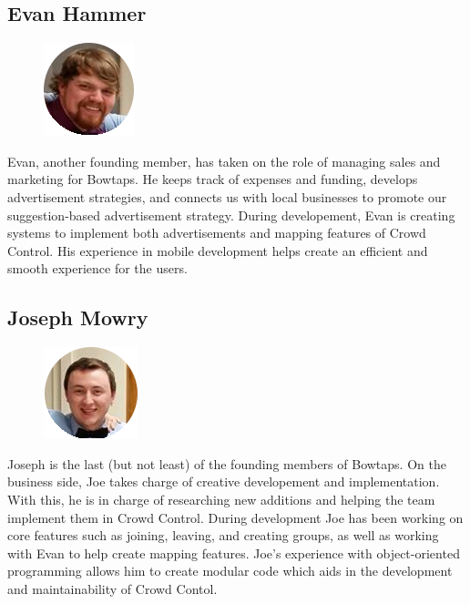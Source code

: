 \noindent
\subsection{Evan Hammer}
\begin{minipage}[t]{\linewidth}%
\begin{figure}
\includegraphics{evanhammer}
\end{figure}
Evan, another founding member, has taken on the role of managing sales and marketing for Bowtaps. He keeps track of expenses and funding, develops advertisement strategies, and connects us with local businesses to promote our suggestion-based advertisement strategy. During developement, Evan is creating systems to implement both advertisements and mapping features of Crowd Control. His experience in mobile development helps create an efficient and smooth experience for the users.
\newline
\newline
\newline
\end{minipage}
 
\noindent
\subsection{Joseph Mowry}
\begin{minipage}[t]{\linewidth}%
\begin{figure}
\includegraphics{joemowry}
\end{figure}
Joseph is the last (but not least) of the founding members of Bowtaps. On the business side, Joe takes charge of creative developement and implementation. With this, he is in charge of researching new additions and helping the team implement them in Crowd Control. During development Joe has been working on core features such as joining, leaving, and creating groups, as well as working with Evan to help create mapping features. Joe's experience with object-oriented programming allows him to create modular code which aids in the development and maintainability of Crowd Contol.
\newline
\newline
\newline
\end{minipage}

